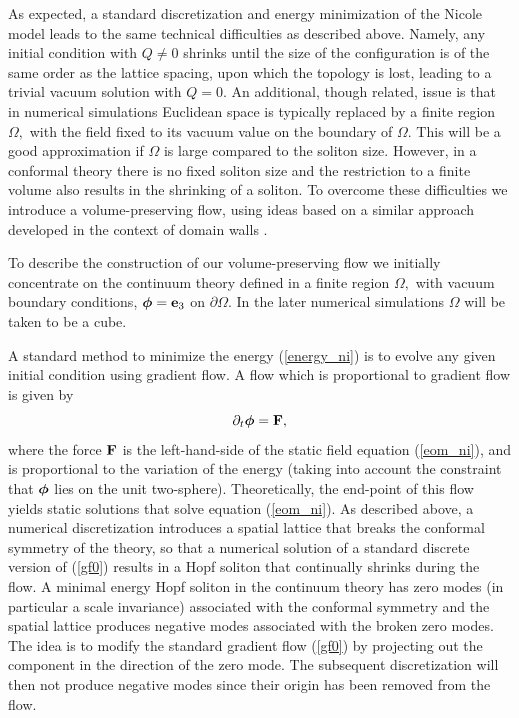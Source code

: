 \documentclass[12pt]{article}
\newcommand{\be}{\begin{equation}}
\newcommand{\ee}{\end{equation}}
\newcommand{\bphi}{\mbox{\boldmath $\phi$}}
\begin{document}
As expected, a standard discretization and energy minimization of the Nicole model
leads to the same technical difficulties as described above. Namely, any
initial condition with $Q\ne 0$ shrinks until the size of the configuration is 
of the same order as the lattice spacing, upon which the topology is lost, leading
to a trivial vacuum solution with $Q=0$.
An additional, though related, issue is that in numerical simulations
Euclidean space is typically replaced by a finite region $\Omega,$
with the field fixed to its vacuum value on the boundary of $\Omega.$
This will be a good approximation if $\Omega$ is large compared
to the soliton size. However, in a conformal theory there is no fixed soliton
size and the restriction to a finite volume also results in the shrinking 
of a soliton. 
To overcome these difficulties we introduce a volume-preserving flow,
using ideas based on a similar approach developed in the context
of domain walls \cite{GS}.

To describe the construction of our volume-preserving flow 
we initially concentrate on the continuum theory defined in
a finite region $\Omega,$ with vacuum boundary conditions,
 $\bphi={\bf e}_3$ on $\partial\Omega.$ In the later numerical
simulations $\Omega$ will be taken to be a cube.

A standard method to minimize the energy (\ref{energy_ni})
is to evolve any given initial condition using gradient flow.
A flow which is proportional to gradient flow is given by
\be
\partial_{t}\bphi={\bf F},
\label{gf0}
\ee
where the force ${\bf F}$ is the left-hand-side of the static 
field equation (\ref{eom_ni}), and is proportional to the variation
of the energy (taking into account the constraint that $\bphi$
lies on the unit two-sphere). Theoretically, the end-point of this flow 
yields static solutions that solve equation (\ref{eom_ni}).
As described above, a numerical discretization introduces
a spatial lattice that breaks the conformal symmetry of the theory, so that
a numerical solution of a standard discrete version of (\ref{gf0}) results
in a Hopf soliton that continually shrinks during the flow.
A minimal energy Hopf soliton in the continuum theory 
has zero modes (in particular a scale invariance) 
associated with the conformal symmetry and the spatial lattice 
produces negative modes associated with the broken zero modes.
The idea is to modify the standard gradient flow (\ref{gf0})
by projecting out the component in the direction of the zero mode.
The subsequent discretization will then not produce negative modes
since their origin has been removed from the flow.  
\end{document}
